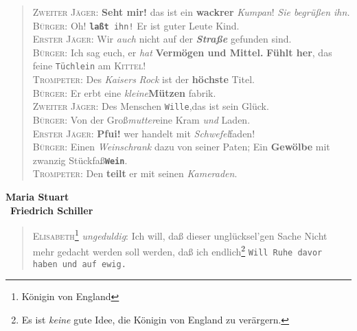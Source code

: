 \documentclass[a4paper, 12pt]{article} %
\begin{document}
\begin{center}
    \begin{verse}
\textsc{Zweiter Jäger:} \textbf{Seht mir!} das ist ein \textbf{\large wackrer} 
\textsl{Kumpan}!
\textit{Sie begrüßen ihn.}\\
\textsc{Bürger:} {\Large Oh!} \texttt{\textbf{laßt} ihn!} Er ist 
\textsf{guter {\large Leute}} Kind. \\
\textsc{Erster Jäger:} Wir \emph{auch} nicht auf der \textit{\Large \textbf{Straße}}
gefunden sind. \\
\textsc{Bürger:} {\tiny Ich sag euch,} er \emph{hat} \textsf{\textbf{Vermögen und Mittel.}}
\textbf{Fühlt \large{her}},
das feine \texttt{Tüchlein} am \textsc{\Large Kittel}{\Huge !}\\
\textsc{Trompeter:} Des \emph{Kaisers} 
\textsl{Rock} ist der {\tiny\bfseries höchste} Titel.\\
\textsc{Bürger:} Er erbt eine \emph{\tiny kleine}\textbf{Mützen}
fabr{\Large i}{\Huge k}.\\
\textsc{Zweiter Jäger:} Des Menschen \texttt{Wille},das
 ist sein \textsf{Glück}.\\
 \textsc{Bürger:} Von der {\Large Groß}\textit{mutter}eine
  Kram \emph{und} Laden.\\
  \textsc{Erster Jäger:} \textbf{Pfui!} wer handelt
  mit \textit{Schwefel}faden!\\
  {\large\textsc{Bürger:} Einen \emph{Weinschrank}
  {\small dazu von seiner} Paten;}
 Ein \textbf{Gewölbe} mit zwanzig Stückfaß\texttt{\bfseries Wein}.\\
  \textsc{Trompeter:} Den \textbf{teilt} er mit
  seinen \emph{Kameraden}.\par\bigskip
    \end{verse}
\end{center}

\begin{center}
    \flqq \textbf{\large Maria Stuart}\frqq\\\
    \flqq \textbf{\large Friedrich Schiller}\frqq\
    \begin{verse}
        
\textsc{Elisabeth\footnote{Königin von England}} \emph{ungeduldig}: \textsf{Ich will, daß dieser 
unglücksel'gen Sache}
Nicht mehr gedacht werden soll werden, daß ich endlich\footnote{Es ist \emph{keine} 
gute Idee, die Königin von England zu verärgern.}
\texttt{Will Ruhe davor haben und auf ewig.}\par\bigskip
\end{verse}
\end{center}
\end{document}
